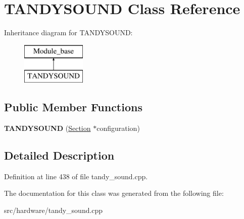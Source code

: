 \hypertarget{classTANDYSOUND}{\section{T\-A\-N\-D\-Y\-S\-O\-U\-N\-D Class Reference}
\label{classTANDYSOUND}
}
Inheritance diagram for T\-A\-N\-D\-Y\-S\-O\-U\-N\-D\-:\begin{figure}[H]
\begin{center}
\leavevmode
\includegraphics[height=2.000000cm]{classTANDYSOUND}
\end{center}
\end{figure}
\subsection*{Public Member Functions}
\begin{DoxyCompactItemize}
\item 
\hypertarget{classTANDYSOUND_a3595cf4fd040eb563c9ffb1dc69944b8}{{\bfseries T\-A\-N\-D\-Y\-S\-O\-U\-N\-D} (\hyperlink{classSection}{Section} $\ast$configuration)}\label{classTANDYSOUND_a3595cf4fd040eb563c9ffb1dc69944b8}

\end{DoxyCompactItemize}


\subsection{Detailed Description}


Definition at line 438 of file tandy\-\_\-sound.\-cpp.



The documentation for this class was generated from the following file\-:\begin{DoxyCompactItemize}
\item 
src/hardware/tandy\-\_\-sound.\-cpp\end{DoxyCompactItemize}
